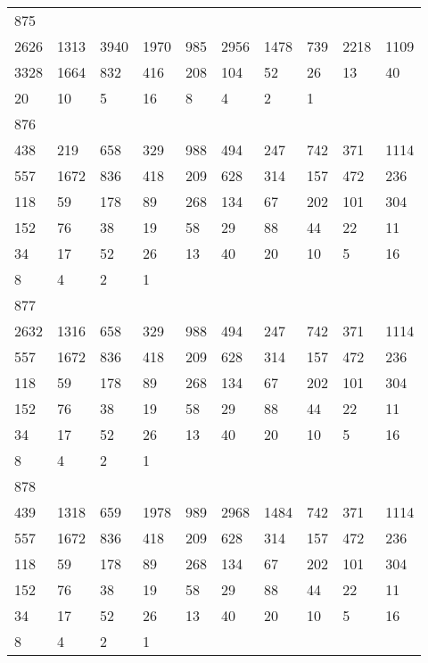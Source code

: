 \begin{longtable}{*{10}{l}}
875&&&&&&&&&\\
2626& 1313& 3940& 1970& 985& 2956& 1478& 739& 2218& 1109\\
3328& 1664& 832& 416& 208& 104& 52& 26& 13& 40\\
20& 10& 5& 16& 8& 4& 2& 1& \\

876&&&&&&&&&\\
438& 219& 658& 329& 988& 494& 247& 742& 371& 1114\\
557& 1672& 836& 418& 209& 628& 314& 157& 472& 236\\
118& 59& 178& 89& 268& 134& 67& 202& 101& 304\\
152& 76& 38& 19& 58& 29& 88& 44& 22& 11\\
34& 17& 52& 26& 13& 40& 20& 10& 5& 16\\
8& 4& 2& 1& \\

877&&&&&&&&&\\
2632& 1316& 658& 329& 988& 494& 247& 742& 371& 1114\\
557& 1672& 836& 418& 209& 628& 314& 157& 472& 236\\
118& 59& 178& 89& 268& 134& 67& 202& 101& 304\\
152& 76& 38& 19& 58& 29& 88& 44& 22& 11\\
34& 17& 52& 26& 13& 40& 20& 10& 5& 16\\
8& 4& 2& 1& \\

878&&&&&&&&&\\
439& 1318& 659& 1978& 989& 2968& 1484& 742& 371& 1114\\
557& 1672& 836& 418& 209& 628& 314& 157& 472& 236\\
118& 59& 178& 89& 268& 134& 67& 202& 101& 304\\
152& 76& 38& 19& 58& 29& 88& 44& 22& 11\\
34& 17& 52& 26& 13& 40& 20& 10& 5& 16\\
8& 4& 2& 1& \\


\end{longtable}
